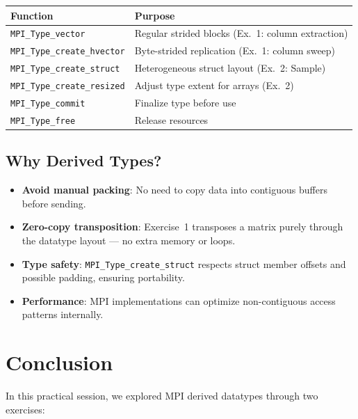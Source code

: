\documentclass[11pt,a4paper]{article}
\begin{document}
\begin{table}[H]
\centering
\begin{tabular}{@{}ll@{}}
\toprule
\textbf{Function} & \textbf{Purpose} \\
\midrule
\texttt{MPI\_Type\_vector} & Regular strided blocks (Ex.~1: column extraction) \\
\texttt{MPI\_Type\_create\_hvector} & Byte-strided replication (Ex.~1: column sweep) \\
\texttt{MPI\_Type\_create\_struct} & Heterogeneous struct layout (Ex.~2: Sample) \\
\texttt{MPI\_Type\_create\_resized} & Adjust type extent for arrays (Ex.~2) \\
\texttt{MPI\_Type\_commit} & Finalize type before use \\
\texttt{MPI\_Type\_free} & Release resources \\
\bottomrule
\end{tabular}
\end{table}

\subsection{Why Derived Types?}

\begin{itemize}
    \item \textbf{Avoid manual packing}: No need to copy data into contiguous buffers before sending.
    \item \textbf{Zero-copy transposition}: Exercise~1 transposes a matrix purely through the datatype layout --- no extra memory or loops.
    \item \textbf{Type safety}: \texttt{MPI\_Type\_create\_struct} respects struct member offsets and possible padding, ensuring portability.
    \item \textbf{Performance}: MPI implementations can optimize non-contiguous access patterns internally.
\end{itemize}

\section{Conclusion}

In this practical session, we explored MPI derived datatypes through two exercises:
\end{document}
